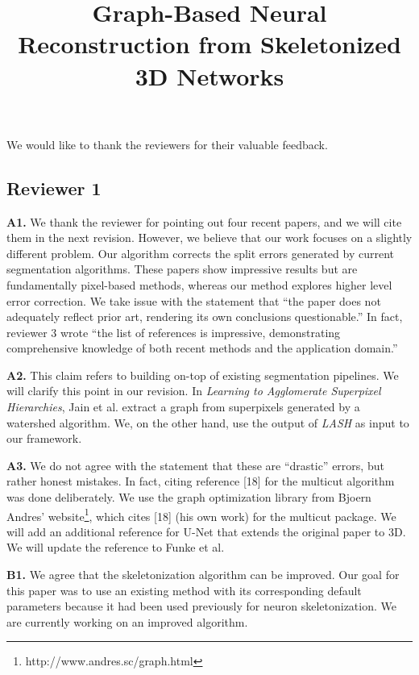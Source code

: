 \documentclass[10pt,twocolumn,letterpaper]{article}
\begin{document}
\title{Graph-Based Neural Reconstruction from Skeletonized 3D Networks}  %

\maketitle
\thispagestyle{empty}



We would like to thank the reviewers for their valuable feedback.

\subsection*{Reviewer 1}

\textbf{A1.} 
We thank the reviewer for pointing out four recent papers, and we will cite them in the next revision. However, we believe that our work focuses on a slightly different problem. Our algorithm corrects the split errors generated by current segmentation algorithms. These papers show impressive results but are fundamentally pixel-based methods, whereas our method explores higher level error correction. We take issue with the statement that ``the paper does not adequately reflect prior art, rendering its own conclusions questionable.'' In fact, reviewer 3 wrote ``the list of references is impressive, demonstrating comprehensive knowledge of both recent methods and the application domain.''

\textbf{A2.} 
This claim refers to building on-top of existing segmentation pipelines. We will clarify this point in our revision. In \textit{Learning to Agglomerate Superpixel Hierarchies}, Jain et al. extract a graph from superpixels generated by a watershed algorithm. We, on the other hand, use the output of \textit{LASH} as input to our framework.

\textbf{A3.} 
We do not agree with the statement that these are ``drastic'' errors, but rather honest mistakes. In fact, citing reference [18] for the multicut algorithm was done deliberately. We use the graph optimization library from Bjoern Andres' website\footnote{http://www.andres.sc/graph.html}, which cites [18] (his own work) for the multicut package. We will add an additional reference for U-Net that extends the original paper to 3D. We will update the reference to Funke et al.

\textbf{B1.} 
We agree that the skeletonization algorithm can be improved. Our goal for this paper was to use an existing method with its corresponding default parameters because it had been used previously for neuron skeletonization. We are currently working on an improved algorithm. 
\end{document}
